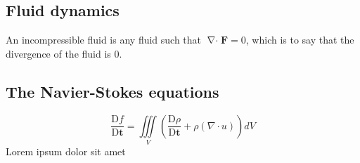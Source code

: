 \documentclass[a4paper, 12pt]{article} %
\newcommand{\fatf}{\mathbf{F}} %
\newcommand{\materialder}[2]{\frac{\mathrm{D} #1}{\mathrm{D} #2}} %
\DeclareMathOperator{\divergence}{\nabla\cdot} %
\begin{document}
\subsection{Fluid dynamics}
An incompressible fluid is any fluid such that $\divergence\fatf=0$, which is to say that the divergence of the fluid is 0.

\subsection{The Navier-Stokes equations}
\begin{equation} %
	\materialder{f}{\mathbf{t}}=\iiint\limits_{V}(\materialder{\rho}{\mathbf{t}}+\rho(\nabla\cdot u))dV
\end{equation}
Lorem ipsum dolor sit amet \cite{peyret2012computational}

\newpage


\end{document}
